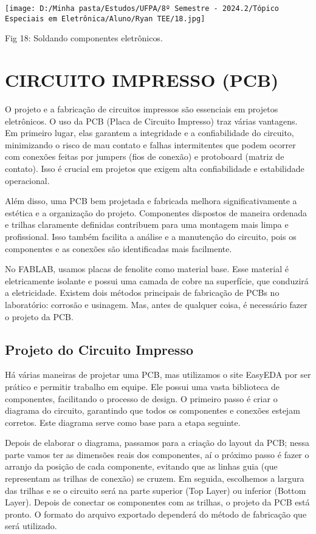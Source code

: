 \documentclass[
]{book}
\begin{document}
\texttt{[image: D:/Minha pasta/Estudos/UFPA/8º Semestre - 2024.2/Tópico Especiais em Eletrônica/Aluno/Ryan TEE/18.jpg]}

Fig 18: Soldando componentes eletrônicos.

\chapter{CIRCUITO IMPRESSO (PCB)}\label{circuito-impresso-pcb}

O projeto e a fabricação de circuitos impressos são essenciais em projetos eletrônicos. O uso da PCB (Placa de Circuito Impresso) traz várias vantagens. Em primeiro lugar, elas garantem a integridade e a confiabilidade do circuito, minimizando o risco de mau contato e falhas intermitentes que podem ocorrer com conexões feitas por jumpers (fios de conexão) e protoboard (matriz de contato). Isso é crucial em projetos que exigem alta confiabilidade e estabilidade operacional.

Além disso, uma PCB bem projetada e fabricada melhora significativamente a estética e a organização do projeto. Componentes dispostos de maneira ordenada e trilhas claramente definidas contribuem para uma montagem mais limpa e profissional. Isso também facilita a análise e a manutenção do circuito, pois os componentes e as conexões são identificadas mais facilmente.

No FABLAB, usamos placas de fenolite como material base. Esse material é eletricamente isolante e possui uma camada de cobre na superfície, que conduzirá a eletricidade. Existem dois métodos principais de fabricação de PCBs no laboratório: corrosão e usinagem. Mas, antes de qualquer coisa, é necessário fazer o projeto da PCB.

\section{Projeto do Circuito Impresso}\label{projeto-do-circuito-impresso}

Há várias maneiras de projetar uma PCB, mas utilizamos o site EasyEDA por ser prático e permitir trabalho em equipe. Ele possui uma vasta biblioteca de componentes, facilitando o processo de design. O primeiro passo é criar o diagrama do circuito, garantindo que todos os componentes e conexões estejam corretos. Este diagrama serve como base para a etapa seguinte.

Depois de elaborar o diagrama, passamos para a criação do layout da PCB; nessa parte vamos ter as dimensões reais dos componentes, aí o próximo passo é fazer o arranjo da posição de cada componente, evitando que as linhas guia (que representam as trilhas de conexão) se cruzem. Em seguida, escolhemos a largura das trilhas e se o circuito será na parte superior (Top Layer) ou inferior (Bottom Layer). Depois de conectar os componentes com as trilhas, o projeto da PCB está pronto. O formato do arquivo exportado dependerá do método de fabricação que será utilizado.
\end{document}
